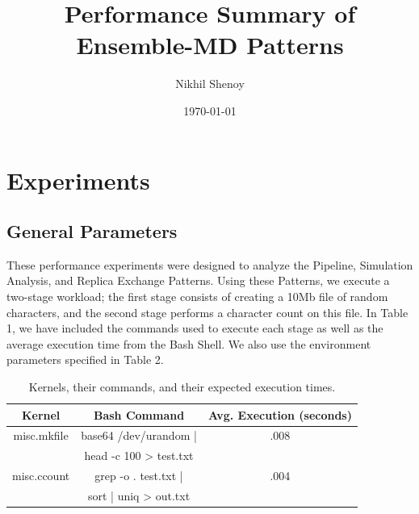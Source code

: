 \documentclass[]{article}
\begin{document}
\title{Performance Summary of Ensemble-MD Patterns}
\author{Nikhil Shenoy}
\date{\today}
\maketitle


\section{Experiments}
	\subsection{General Parameters}
		These performance experiments were designed to analyze the Pipeline, Simulation Analysis, and Replica Exchange Patterns. Using these Patterns, we execute a two-stage workload; the first stage consists of creating a 10Mb file of random characters, and the second stage performs a character count on this file. In Table 1, we have included the commands used to execute each stage as well as the average execution time from the Bash Shell. We also use the environment parameters specified in Table 2.

		\begin{table}[h!]
			\centering
			\begin{tabu}{|c|c|c|}
				\hline
				Kernel & Bash Command & Avg. Execution (seconds) \\
				\hline
				misc.mkfile & base64 /dev/urandom | & .008 \\ 
							& head -c 100 > test.txt \\
				\hline
				misc.ccount & grep -o . test.txt |  & .004\\ 
							& sort | uniq > out.txt   \\
				\hline
			\end{tabu}
			\caption{Kernels, their commands, and their expected execution times.}
		\end{table}
\end{document}
